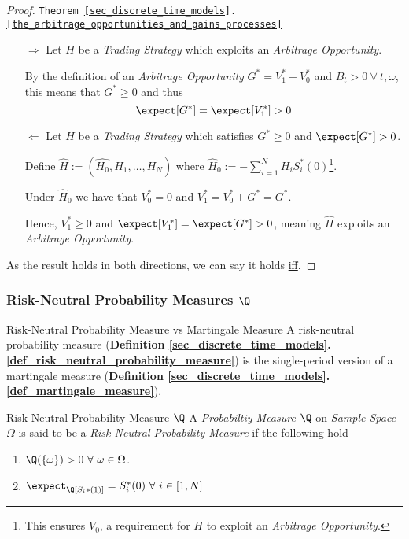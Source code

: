 \documentclass[11pt,a4paper]{article}
\begin{document}
  \begin{proof}{\texttt{Theorem \ref{sec_discrete_time_models}.\ref{the_arbitrage_opportunities_and_gains_processes}}}
    \begin{itemize}
      \item[$\Rightarrow$] Let $H$ be a \textit{Trading Strategy} which exploits an \textit{Arbitrage Opportunity}.
      \par By the definition of an \textit{Arbitrage Opportunity} $G^*=V_1^*-V_0^*$ and $B_t>0\ \forall\ t,\omega$, this means that $G^*\geq0$ and thus
      \[ \expect[G^*]=\expect[V_1^*]>0 \]
      \item[$\Leftarrow$] Let $H$ be a \textit{Trading Strategy} which satisfies $G^*\geq0$ and $\expect[G^*]>0$.
      \par Define $\hat{H}:=(\hat{H_0},H_1,\dots,H_N)$ where $\hat{H}_0:=-\sum_{i=1}^NH_iS_i^*(0)$\footnote{This ensures $V_0$, a requirement for $H$ to exploit an \textit{Arbitrage Opportunity}.}.
      \par Under $\hat{H}_0$ we have that $V_0^*=0$ and $V_1^*=V_0^*+G^*=G^*$.
      \par Hence, $V_1^*\geq0$ and $\expect[V_1^*]=\expect[G^*]>0$, meaning $\hat{H}$ exploits an \textit{Arbitrage Opportunity}.
    \end{itemize}
    As the result holds in both directions, we can say it holds \underline{iff}.
  \end{proof}

\subsubsection{Risk-Neutral Probability Measures $\Q$}

  \begin{remark}{Risk-Neutral Probability Measure vs Martingale Measure}
    A risk-neutral probability measure (\textbf{Definition \ref{sec_discrete_time_models}.\ref{def_risk_neutral_probability_measure}}) is the single-period version of a martingale measure (\textbf{Definition \ref{sec_discrete_time_models}.\ref{def_martingale_measure}}).
  \end{remark}

  \begin{definition}{Risk-Neutral Probability Measure $\Q$}\label{def_risk_neutral_probability_measure}
    A \textit{Probabiltiy Measure} $\Q$ on \textit{Sample Space} $\Omega$ is said to be a \textit{Risk-Neutral Probability Measure} if the following hold
    \begin{enumerate}
      \item $\Q(\{\omega\})>0\ \forall\ \omega\in\Omega$.
      \item $\expect_\Q[S_i*(1)]=S_i^*(0)\ \forall\ i\in[1,N]$
    \end{enumerate}
  \end{definition}
\end{document}
